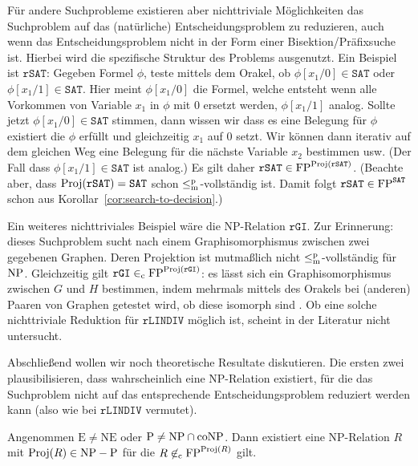 Für andere Suchprobleme existieren aber nichttriviale Möglichkeiten  das Suchproblem auf das (natürliche) Entscheidungsproblem zu reduzieren, auch wenn das Entscheidungsproblem nicht in der Form einer Bisektion/Präfixsuche ist. Hierbei wird die spezifische Struktur des Problems ausgenutzt. Ein Beispiel ist $\mathtt{rSAT}$: Gegeben Formel $\phi$, teste mittels dem Orakel, ob $\phi[x_1/0]\in\mathtt{SAT}$ oder $\phi[x_1/1]\in\mathtt{SAT}$. Hier meint $\phi[x_1/0]$ die Formel, welche entsteht wenn alle Vorkommen von Variable $x_1$ in $\phi$ mit $0$ ersetzt werden, $\phi[x_1/1]$ analog. Sollte jetzt $\phi[x_1/0]\in\mathtt{SAT}$ stimmen, dann wissen wir dass es eine Belegung für $\phi$ existiert die $\phi$ erfüllt und gleichzeitig $x_1$ auf $0$ setzt. Wir können dann iterativ auf dem gleichen Weg eine Belegung für die nächste Variable $x_2$ bestimmen usw. (Der Fall dass $\phi[x_1/1]\in\mathtt{SAT}$ ist analog.) Es gilt daher $\mathtt{rSAT}\in\mathrm{FP}^{\operatorname{Proj}(\mathtt{rSAT})}$.
(Beachte aber, dass $\operatorname{Proj}(\mathtt{rSAT})=\mathtt{SAT}$ schon $\leq_\mathrm{m}^\mathrm{p}$-vollständig ist. Damit folgt $\mathtt{rSAT}\in \mathrm{FP}^{\mathtt{SAT}}$ schon aus Korollar~\ref{cor:search-to-decision}.)

Ein weiteres nichttriviales Beispiel wäre die NP-Relation $\mathtt{rGI}$. Zur Erinnerung: dieses Suchproblem sucht nach einem Graphisomorphismus zwischen zwei gegebenen Graphen.
Deren Projektion ist mutmaßlich nicht $\leq_\mathrm{m}^\mathrm{p}$-vollständig für $\mathrm{NP}$. 
Gleichzeitig gilt $\mathtt{rGI}\in_\mathrm{c} \mathrm{FP}^{\operatorname{Proj}(\mathtt{rGI})}$: es lässt sich ein Graphisomorphismus zwischen $G$ und $H$ bestimmen, indem mehrmals mittels des Orakels bei (anderen) Paaren von  Graphen getestet wird, ob diese isomorph sind \parencite[vgl.][S. 65, 100]{goldreich_computational_2008}.
Ob eine solche nichttriviale Reduktion für $\mathtt{rLINDIV}$ möglich ist, scheint in der Literatur nicht untersucht.

Abschließend wollen wir noch theoretische Resultate diskutieren. Die ersten zwei plausibilisieren, dass wahrscheinlich eine NP-Relation existiert, für die das Suchproblem nicht auf das entsprechende Entscheidungsproblem reduziert werden kann (also wie bei $\mathtt{rLINDIV}$ vermutet).

\begin{theorem}
    Angenommen $\mathrm{E\neq NE}$ oder $\mathrm{P}\neq \mathrm{NP}\cap\mathrm{coNP}$. Dann existiert eine NP-Relation $R$ mit $\operatorname{Proj}(R)\in \mathrm{NP}-\mathrm{P}$ für die $R\not\in_\mathrm{c}\mathrm{FP}^{\operatorname{Proj}(R)}$ gilt.
\end{theorem}

